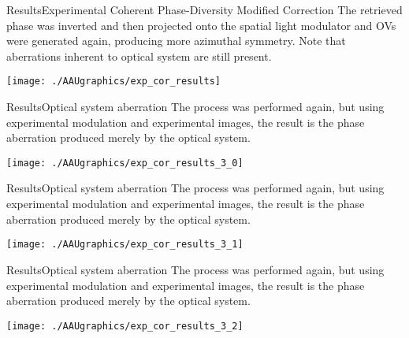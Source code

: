 \documentclass[10pt]{beamer}
\begin{document}
\begin{frame}{Results}{Experimental Coherent Phase-Diversity Modified Correction}
The retrieved phase was inverted and then projected onto the spatial light modulator and OVs were generated again, producing more azimuthal symmetry. Note that aberrations inherent to optical system are still present.

\vspace*{10pt}
\hspace*{30pt}
\texttt{[image: ./AAUgraphics/exp\_cor\_results]}
\end{frame}

\begin{frame}{Results}{Optical system aberration}
The process was performed again, but using experimental modulation and experimental images, the result is the phase aberration produced merely by the optical system.

\vspace*{10pt}
\texttt{[image: ./AAUgraphics/exp\_cor\_results\_3\_0]}
\end{frame}

\begin{frame}{Results}{Optical system aberration}
The process was performed again, but using experimental modulation and experimental images, the result is the phase aberration produced merely by the optical system.

\vspace*{10pt}
\addtocounter{framenumber}{-1}
\texttt{[image: ./AAUgraphics/exp\_cor\_results\_3\_1]}
\end{frame}

\begin{frame}{Results}{Optical system aberration}
The process was performed again, but using experimental modulation and experimental images, the result is the phase aberration produced merely by the optical system.

\vspace*{10pt}
\addtocounter{framenumber}{-1}
\texttt{[image: ./AAUgraphics/exp\_cor\_results\_3\_2]}
\end{frame}
\end{document}
